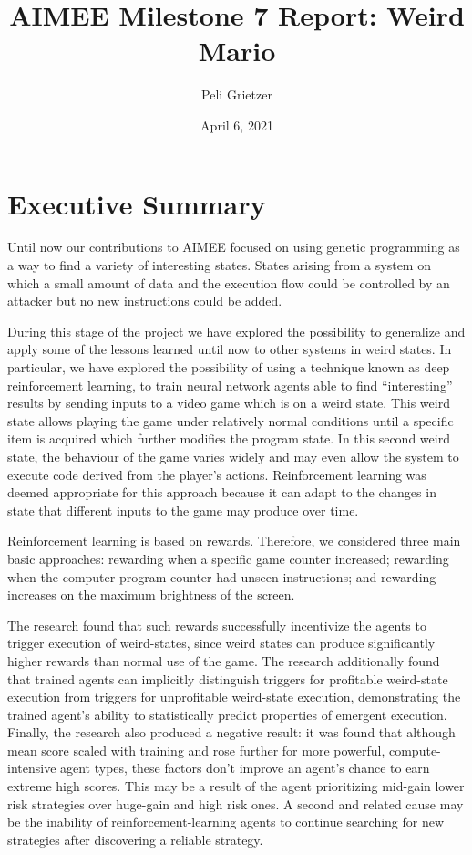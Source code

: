 \documentclass[]{article}
\title{AIMEE Milestone 7 Report: Weird Mario}
\author{Peli Grietzer}
\date{April 6, 2021}
\begin{document}
\maketitle

\hypertarget{executive-summary}{%
\section{Executive Summary}\label{executive-summary}}

Until now our contributions to AIMEE focused on using genetic
programming as a way to find a variety of interesting states. States
arising from a system on which a small amount of data and the execution
flow could be controlled by an attacker but no new instructions could be
added.

During this stage of the project we have explored the possibility to
generalize and apply some of the lessons learned until now to other
systems in weird states. In particular, we have explored the possibility
of using a technique known as deep reinforcement learning, to train
neural network agents able to find ``interesting'' results by sending
inputs to a video game which is on a weird state. This weird state
allows playing the game under relatively normal conditions until a
specific item is acquired which further modifies the program state. In
this second weird state, the behaviour of the game varies widely and may
even allow the system to execute code derived from the player's actions.
Reinforcement learning was deemed appropriate for this approach because
it can adapt to the changes in state that different inputs to the game
may produce over time.

Reinforcement learning is based on rewards. Therefore, we considered
three main basic approaches: rewarding when a specific game counter
increased; rewarding when the computer program counter had unseen
instructions; and rewarding increases on the maximum brightness of the
screen.

The research found that such rewards successfully incentivize the agents
to trigger execution of weird-states, since weird states can produce
significantly higher rewards than normal use of the game. The research
additionally found that trained agents can implicitly distinguish
triggers for profitable weird-state execution from triggers for
unprofitable weird-state execution, demonstrating the trained agent's
ability to statistically predict properties of emergent execution.
Finally, the research also produced a negative result: it was found that
although mean score scaled with training and rose further for more
powerful, compute-intensive agent types, these factors don't improve an
agent's chance to earn extreme high scores. This may be a result of the
agent prioritizing mid-gain lower risk strategies over huge-gain and
high risk ones. A second and related cause may be the inability of
reinforcement-learning agents to continue searching for new strategies
after discovering a reliable strategy.
\end{document}
